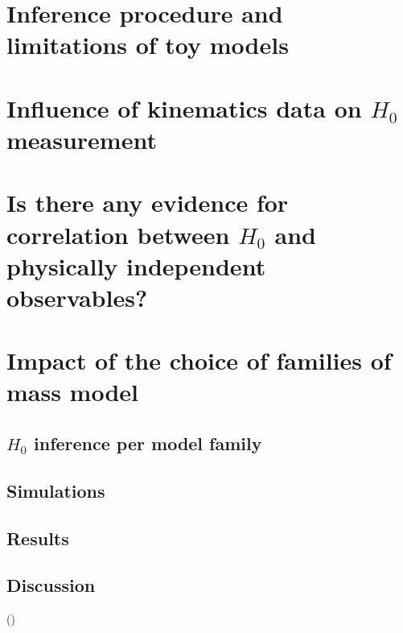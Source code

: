 \documentclass[traditabstract, twocolumns, longauth]{aa}
\newcommand{\Hc}{\ensuremath{H_0}\xspace}
\begin{document}
\section{Inference procedure and limitations of toy models}
\label{sec:toysareforbabies}

\section{Influence of kinematics data on \Hc measurement \label{sec:kinematics_impact}}
\label{sec:kinem_sensitivity}

\section{Is there any evidence for correlation between \Hc and physically independent observables?}
\label{sec:corr}

\section{Impact of the choice of families of mass model}
\label{sec:6}

\subsection{\Hc inference per model family}
\label{ssec:powervscomposite}

\subsection{Simulations}
\label{ssec:sim}


\subsection{Results}
\label{ssec:results}

\subsection{Discussion}
\label{ssec:disc}

({})
\end{document}
